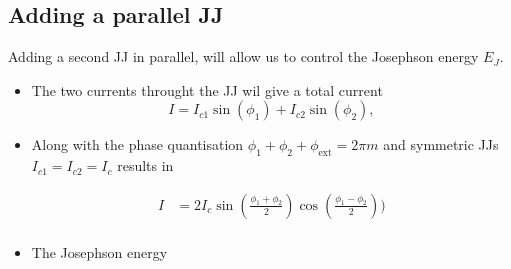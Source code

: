 %  
\newpage \subsection{Adding a parallel JJ\label{subsec:cpb_2}}
 Adding a second JJ in parallel, will allow us to control the Josephson energy $ E_J $.
 \begin{itemize}
 	\item The two currents throught the JJ wil give a total current	\begin{equation}
 	I = I_{c1}\sin(\phi_1)+I_{c2}\sin(\phi_2),
 	\end{equation}
 	
 	\item Along with the phase quantisation $ \phi_1+\phi_2+\phi_\text{ext} = 2\pi m $ and symmetric JJs $I_{c1}=I_{c2}=I_c$ results in
 	
 	\begin{equation}
 	\begin{aligned}
 	I & = 2I_c\sin(\frac{\phi_1+\phi_2}{2})\cos(\frac{\phi_1-\phi_2}{2})) \\
 	\end{aligned}
 	\end{equation}
 	

	\item The Josephson energy
	

\end{itemize}
